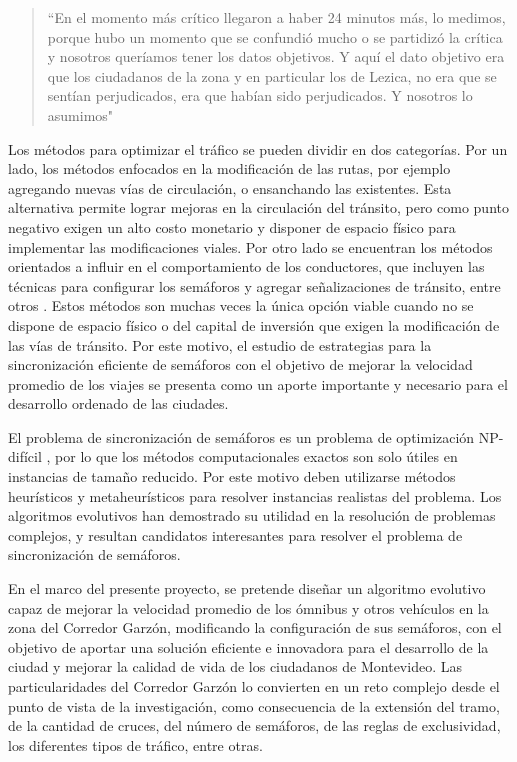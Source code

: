 \begin{quote}\small
	``En el momento más crítico llegaron a haber 24 minutos más, lo medimos, porque hubo un momento que se confundió mucho o se partidizó la crítica y nosotros queríamos tener los datos objetivos. Y aquí el dato objetivo era que los ciudadanos de la zona y en particular los de Lezica, no era que se sentían perjudicados, era que habían sido perjudicados. Y nosotros lo asumimos"
\end{quote}

Los métodos para optimizar el tráfico se pueden dividir en dos categorías. Por un lado, los métodos enfocados en la modificación de las rutas, por ejemplo agregando nuevas vías de circulación, o ensanchando las existentes. Esta alternativa permite lograr mejoras en la circulación del tránsito, pero como punto negativo exigen un alto costo monetario \citep{litman2009transportation} y disponer de espacio físico para implementar las modificaciones viales. Por otro lado se encuentran los métodos orientados a influir en el comportamiento de los conductores, que incluyen las técnicas para configurar los semáforos y agregar señalizaciones de tránsito, entre otros \citep{mckenney2013distributed}. Estos métodos son muchas veces la única opción viable cuando no se dispone de espacio físico o del capital de inversión que exigen la modificación de las vías de tránsito. Por este motivo, el estudio de estrategias para la sincronización eficiente de semáforos con el objetivo de mejorar la velocidad promedio de los viajes se presenta como un aporte importante y necesario para el desarrollo ordenado de las ciudades. 

El problema de sincronización de semáforos es un problema de optimización NP-difícil \citep{yang1996model}, por lo que los métodos computacionales exactos son solo útiles en instancias de tamaño reducido. Por este motivo deben utilizarse métodos heurísticos y metaheurísticos para resolver instancias realistas del problema. Los algoritmos evolutivos han demostrado su utilidad en la resolución de problemas complejos, y resultan candidatos interesantes para resolver el problema de sincronización de semáforos. 

En el marco del presente proyecto, se pretende diseñar un algoritmo evolutivo capaz de mejorar la velocidad promedio de los ómnibus y otros vehículos en la zona del Corredor Garzón, modificando la configuración de sus semáforos, con el objetivo de aportar una solución eficiente e innovadora para el desarrollo de la ciudad y mejorar la calidad de vida de los ciudadanos de Montevideo. Las particularidades del Corredor Garzón lo convierten en un reto complejo desde el punto de vista de la investigación, como consecuencia de la extensión del tramo, de la cantidad de cruces, del número de semáforos, de las reglas de exclusividad, los diferentes tipos de tráfico, entre otras.



